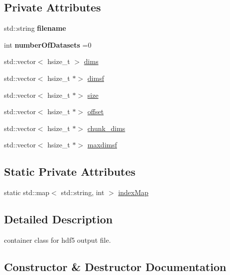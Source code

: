 \subsection*{Private Attributes}
\begin{DoxyCompactItemize}
\item 
\mbox{\label{classDataFile_abc135462835aa32daf961c8382448ca4}} 
std\+::string {\bfseries filename}
\item 
\mbox{\label{classDataFile_a32283899b559bf2816f4eb582af95ec2}} 
int {\bfseries number\+Of\+Datasets} =0
\item 
std\+::vector$<$ hsize\+\_\+t $>$ \hyperlink{classDataFile_affee6a54566b327d75def5fb21a9351b}{dims}
\item 
std\+::vector$<$ hsize\+\_\+t $\ast$$>$ \hyperlink{classDataFile_a93dc46888578ba19d25940638904c678}{dimsf}
\item 
std\+::vector$<$ hsize\+\_\+t $\ast$$>$ \hyperlink{classDataFile_ace2d4ef0b734ca4f1945b60f3acc9912}{size}
\item 
std\+::vector$<$ hsize\+\_\+t $\ast$$>$ \hyperlink{classDataFile_a6574c6c8e7e7a161b1a97f5ab669e2a6}{offset}
\item 
std\+::vector$<$ hsize\+\_\+t $\ast$$>$ \hyperlink{classDataFile_afec13483acd0763fbe2b635c5bf459f9}{chunk\+\_\+dims}
\item 
std\+::vector$<$ hsize\+\_\+t $\ast$$>$ \hyperlink{classDataFile_a60c9e3ae1cf557b5a396754c203a08c7}{maxdimsf}
\end{DoxyCompactItemize}
\subsection*{Static Private Attributes}
\begin{DoxyCompactItemize}
\item 
static std\+::map$<$ std\+::string, int $>$ \hyperlink{classDataFile_ab08fca1e2ac3355f2279faf37054ddfc}{index\+Map}
\end{DoxyCompactItemize}


\subsection{Detailed Description}
container class for hdf5 output file. 

\subsection{Constructor \& Destructor Documentation}
\mbox{\label{classDataFile_a506afaa3e498c06d841cfd2166724add}} 
